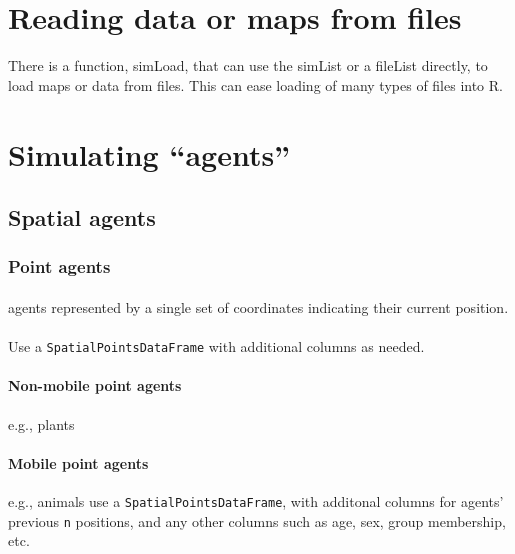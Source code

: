 \documentclass{article}
\begin{document}
\newpage

\section{Reading data or maps from files}
There is a function, simLoad, that can use the simList or a fileList directly, to load maps or data from files. This can ease loading of many types of files into R.

\newpage

\section{Simulating ``agents''}

\subsection{Spatial agents}

\subsubsection{Point agents}

\paragraph{}
agents represented by a single set of coordinates indicating their current position.

\paragraph{}
Use a \texttt{SpatialPointsDataFrame} with additional columns as needed.

\paragraph{Non-mobile point agents}
e.g., plants

\paragraph{Mobile point agents}
e.g., animals use a \texttt{SpatialPointsDataFrame}, with additonal columns for agents' previous \texttt{n} positions, and any other columns such as age, sex, group membership, etc.


\paragraph{}
\end{document}
